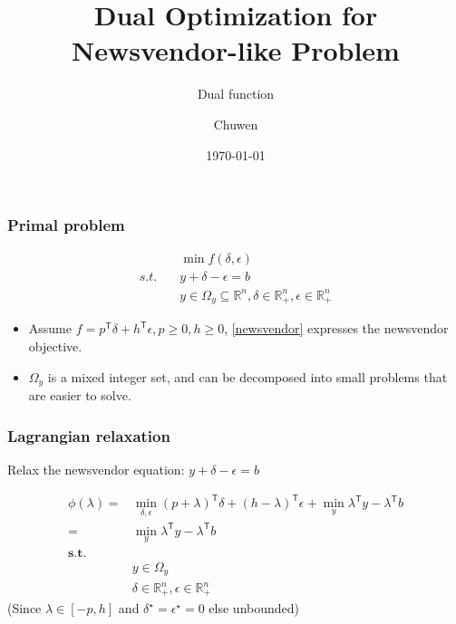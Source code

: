 
\title{Dual Optimization for Newsvendor-like Problem}
\author{Chuwen}
\date{\today}


\frame{\titlepage}


\begin{frame}
  \frametitle{Primal problem}

  \begin{align}
                                  & \min f(\delta, \epsilon)                                                                       \\
    \label{newsvendor} s.t. \quad & y + \delta - \epsilon = b                                                                      \\
                                  & y \in \Omega_y \subseteq \mathbb{R}^n, \delta \in \mathbb{R}^n_+ , \epsilon \in \mathbb{R}^n_+
  \end{align}

  \begin{itemize}
    \item Assume \(f=p^\mathsf{T}\delta + h^\mathsf{T}\epsilon, p \ge 0, h \ge 0\), \eqref{newsvendor} expresses the newsvendor objective.
    \item \(\Omega_y\) is a mixed integer set, and can be decomposed into small problems that are easier to solve.
  \end{itemize}
\end{frame}


\begin{frame}
  \frametitle{Lagrangian relaxation}

  Relax the newsvendor equation: \(y + \delta - \epsilon = b\)

  \subtitle{Dual function}
  \begin{equation}\label{eq:dual}
    \begin{aligned}
      \phi(\lambda) = & \min_{\delta, \epsilon} (p + \lambda)^\mathsf{T}\delta + (h - \lambda)^\mathsf{T}\epsilon + \min_y \lambda^\mathsf{T} y - \lambda^\mathsf{T} b \\
      =               & \min_y \lambda^\mathsf{T} y - \lambda^\mathsf{T} b                                                                                             \\
      \mathbf{s.t.}   &                                                                                                                                                \\
                      & y \in \Omega_y                                                                                                                                 \\
                      & \delta \in \mathbb{R}^n_+ , \epsilon \in \mathbb{R}^n_+
    \end{aligned}
  \end{equation}
  (Since \(\lambda \in [-p, h] \) and \(\delta^\star = \epsilon^\star = 0\) else unbounded)

\end{frame}


